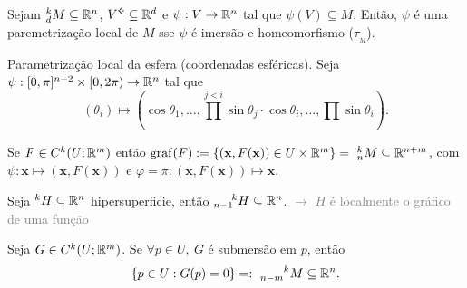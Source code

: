 \begin{lemma}
    Sejam \(^k_d M \subseteq \mathbb{R}^n \), \(V\ab\subseteq \R^d\) e \(\psi: V \to \mathbb{R}^n\) tal que \(\psi(V)\subseteq M \). Então, \(\psi\) é uma paremetrização local de \(M\) sse \(\psi \) é imersão e homeomorfismo (\(\tau_{_M}\)). 
\end{lemma}



\begin{example}%
    Parametrização local da esfera (coordenadas esféricas). Seja \(\psi: [0,\pi]^{n-2}\times [0, 2\pi) \to  \mathbb{R}^n\) tal que     
    \[(\theta_i) \mapsto \left(\cos\theta_1, \ldots, \prod^{j<i}\sin\theta_j \cdot \cos\theta_{i},\ldots, \prod\sin\theta_i\right). \] 
\end{example}
\begin{example}%
    Se \(F\in C^k(U; \mathbb{R}^m)\) então \(\operatorname{graf}(F):= \{(\textbf{x},F(\textbf{x})) \in U\times\mathbb{R}^m\} = \ ^k_n M \subseteq \mathbb{R}^{n+m}\), com \(\psi: \textbf{x} \mapsto (\textbf{x}, F(\textbf{x}))\) e \(\varphi = \pi : (\textbf{x}, F(\textbf{x})) \mapsto \textbf{x}\).   
\end{example}
\begin{example}
    Seja \(^k H\subseteq \mathbb{R}^n\) hipersuperficie, então \(^{\hspace{0.5cm}k}_{n-1} H\subseteq \mathbb{R}^n\). \textcolor{gray}{\(\rightarrow\) \(H\) é localmente o gráfico de uma função} 
\end{example}

\begin{proposition}
    Seja \(G\in C^k(U;\mathbb{R}^m) \). Se \(\forall p \in U, \ G\) é submersão em \(p\), então \[\{p \in U : G(p)=0\} =:\ ^{\hspace{0.65cm}k}_{n-m}M \subseteq \R^n.\]     
\end{proposition}



